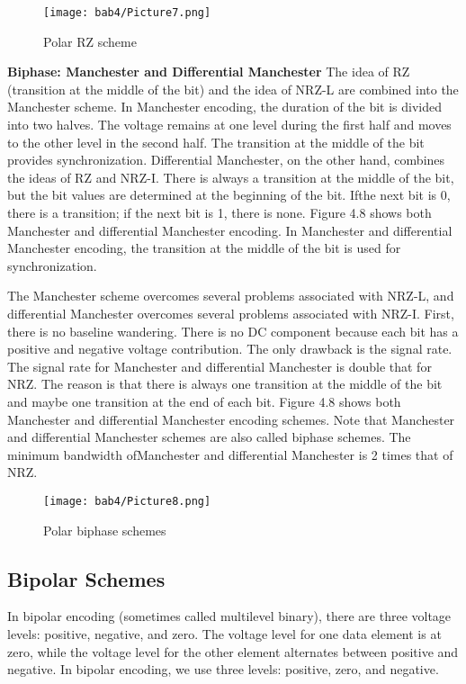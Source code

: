 \begin{figure}
  \centering
  \texttt{[image: bab4/Picture7.png]}
  \caption{Polar RZ scheme}
  \label{fig4:7}
\end{figure}

\textbf{Biphase: Manchester and Differential Manchester} The idea of RZ (transition at the middle of the bit) and the idea of NRZ-L are combined into the Manchester scheme. In Manchester encoding, the duration of the bit is divided into two halves. The voltage remains at one level during the first half and moves to the other level in the second half. The transition at the middle of the bit provides synchronization. Differential Manchester, on the other hand, combines the ideas of RZ and NRZ-I. There is always a transition at the middle of the bit, but the bit values are determined at the beginning of the bit. Ifthe next bit is 0, there is a transition; if the next bit is 1, there is none. Figure 4.8 shows both Manchester and differential Manchester encoding. In Manchester and differential Manchester encoding, the transition at the middle of the bit is used for synchronization.

The Manchester scheme overcomes several problems associated with NRZ-L, and differential Manchester overcomes several problems associated with NRZ-I. First, there is no baseline wandering. There is no DC component because each bit has a positive and negative voltage contribution. The only drawback is the signal rate. The signal rate for Manchester and differential Manchester is double that for NRZ. The reason is that there is always one transition at the middle of the bit and maybe one transition at the end of each bit. Figure 4.8 shows both Manchester and differential Manchester encoding schemes. Note that Manchester and differential Manchester schemes are also called biphase schemes. The minimum bandwidth ofManchester and differential Manchester is 2 times that of NRZ.

\begin{figure}[htbp]
  \centering
  \texttt{[image: bab4/Picture8.png]}
  \caption{Polar biphase schemes}
  \label{fig4:8}
\end{figure}

\subsection*{Bipolar Schemes}
In bipolar encoding (sometimes called multilevel binary), there are three voltage levels: positive, negative, and zero. The voltage level for one data element is at zero, while the voltage level for the other element alternates between positive and negative. In bipolar encoding, we use three levels: positive, zero, and negative.

